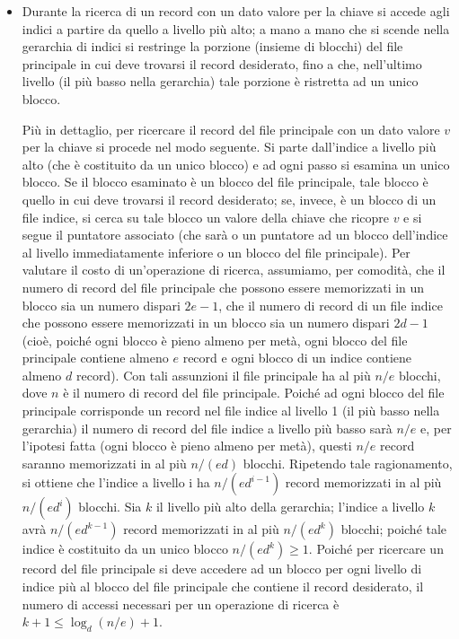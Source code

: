 \begin{itemize}
    \item Durante la ricerca di un record con un dato valore per la chiave si accede agli indici a partire da quello a livello più alto; a mano a mano che si scende nella gerarchia di indici si restringe la porzione (insieme di blocchi) del file principale in cui deve trovarsi il record desiderato, fino a che, nell'ultimo livello (il più basso nella gerarchia) tale porzione è ristretta ad un unico blocco. 

    Più in dettaglio, per ricercare il record del file principale con un dato valore $v$ per la chiave si procede nel modo seguente. Si parte dall'indice a livello più alto (che è costituito da un unico blocco) e ad ogni passo si esamina un unico blocco. Se il blocco esaminato è un blocco del file principale, tale blocco è quello in cui deve trovarsi il record desiderato; se, invece, è un blocco di un file indice, si cerca su tale blocco un valore della chiave che ricopre $v$ e si segue il puntatore associato (che sarà o un puntatore ad un blocco dell'indice al livello immediatamente inferiore o un blocco del file principale). Per valutare il costo di un'operazione di ricerca, assumiamo, per comodità, che il numero di record del file principale che possono essere memorizzati in un blocco sia un numero dispari $2e-1$, che il numero di record di un file indice che possono essere memorizzati in un blocco sia un numero dispari $2d-1$ (cioè, poiché ogni blocco è pieno almeno per metà, ogni blocco del file principale contiene almeno $e$ record e ogni blocco di un indice contiene almeno $d$ record). Con tali assunzioni il file principale ha al più $n/e$ blocchi, dove $n$ è il numero di record del file principale. Poiché ad ogni blocco del file principale corrisponde un record nel file indice al livello 1 (il più basso nella gerarchia) il numero di record del file indice a livello più basso sarà $n/e$ e, per l'ipotesi fatta (ogni blocco è pieno almeno per metà), questi $n/e$ record saranno memorizzati in al più $n/(ed)$ blocchi. Ripetendo tale ragionamento, si ottiene che l'indice a livello i ha $n/(ed^{i-1})$ record memorizzati in al più $n/(ed^i)$ blocchi. Sia $k$ il livello più alto della gerarchia; l'indice a livello $k$ avrà $n/(ed^{k-1})$ record memorizzati in al più $n/(ed^k)$ blocchi; poiché tale indice è costituito da un unico blocco $n/(ed^k)\geq1$. Poiché per ricercare un record del file principale si deve accedere ad un blocco per ogni livello di indice più al blocco del file principale che contiene il record desiderato, il numero di accessi necessari per un operazione di ricerca è $k+1\leq\log_d(n/e)+1$.


\end{itemize}
